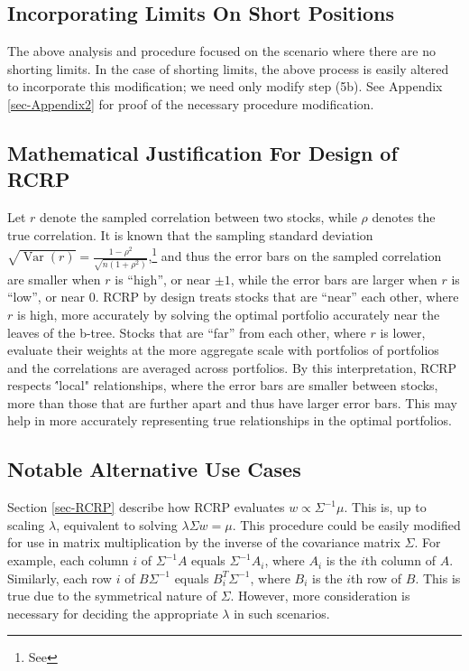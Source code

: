 \documentclass[10pt,twoside,titlepage]{article}   %
\begin{document}
\subsection{Incorporating Limits On Short Positions}\label{sec-LimitShorts}
The above analysis and procedure focused on the scenario where there are no shorting limits.
In the case of shorting limits, the above process is easily altered to incorporate this modification; we need only modify step (5b).
See Appendix \ref{sec-Appendix2} for proof of the necessary procedure modification.

\subsection{Mathematical Justification For Design of RCRP}\label{sec-MatheComment}
Let $r$ denote the sampled correlation between two stocks, while $\rho$ denotes the true correlation.
It is known that the sampling standard deviation $\sqrt{\operatorname{Var}(r)}= \frac{ 1 - \rho^2}{\sqrt{n (1+\rho^2) }}$,\footnote{See \CORRURL}
and thus the error bars on the sampled correlation are smaller when $r$ is “high”, or near $\pm 1$,
while the error bars are larger when $r$ is “low”, or near 0.
RCRP by design treats stocks that are “near” each other, where $r$ is high,
more accurately by solving the optimal portfolio accurately near the leaves of the b-tree.
Stocks that are “far” from each other, where $r$ is lower,
evaluate their weights at the more aggregate scale with portfolios of portfolios and the correlations are averaged across portfolios.
By this interpretation, RCRP respects \''local" relationships, where the error bars are smaller between stocks, more than those that are further apart and thus have larger error bars.
This may help in more accurately representing true relationships in the optimal portfolios.

\subsection{Notable Alternative Use Cases}\label{sec-AltUseCase}
Section \ref{sec-RCRP} describe how RCRP evaluates $w \propto \Sigma^{-1}\mu$. This is, up to scaling $\lambda$, equivalent to solving $\lambda \Sigma w = \mu$.
This procedure could be easily modified for use in matrix multiplication by the inverse of the covariance matrix $\Sigma$.
For example, each column $i$ of $\Sigma^{-1}A$ equals $\Sigma^{-1}A_i$, where $A_i$ is the $i$th column of $A$.
Similarly, each row $i$ of $B\Sigma^{-1}$ equals $B_i^T\Sigma^{-1}$, where $B_i$ is the $i$th row of $B$.
This is true due to the symmetrical nature of $\Sigma$.
However, more consideration is necessary for deciding the appropriate $\lambda$ in such scenarios.
\end{document}
